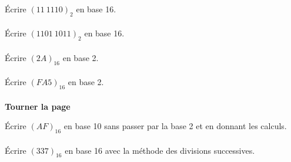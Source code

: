 \documentclass[a4paper,12pt,eval,firamath]{nsi}
\begin{document}
\maketitle

\'Ecrire $(11\ 1110)_2$ en base 16.\\

\\

\'Ecrire $(1101\ 1011)_2$ en base 16.\\

\\

\'Ecrire $(2A)_{16}$ en base 2.\\

\\

\'Ecrire $(FA5)_{16}$ en base 2.\\

\\

{\hfill\textbf{Tourner la page}}

\newpage

\'Ecrire $(AF)_{16}$ en base 10 sans passer par la base 2 et en donnant les calculs.\\

\\

\'Ecrire $(337)_{16}$ en base 16 avec la méthode des divisions successives.\\

\end{document}
